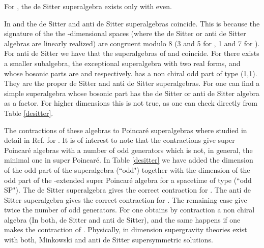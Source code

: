 \documentclass[a4paper,12pt]{article}
\begin{document}
For \coordHE{}, the de Sitter superalgebra exists only with \coordHE{}
even.

In \coordHE{} and \coordHE{} the de Sitter and anti de Sitter superalgebras
coincide. This is because the signature  \myHighlight{$\pm \rho$}\coordHE{}  of the  the
\coordHE{}-dimensional spaces (where the de Sitter or anti de Sitter
algebras are linearly realized) are congruent modulo 8 (3 and 5
for \coordHE{}, 1 and 7 for \coordHE{}). For anti de Sitter we have that
the superalgebras of \coordHE{} and \coordHE{} coincide. For \coordHE{}
there exists a smaller subalgebra, the exceptional superalgebra
\coordHE{} with two real forms, \coordHE{} and \coordHE{} whose bosonic
parts are \coordHE{} and \coordHE{} respectively. \coordHE{} has a non chiral odd part of type
(1,1). They are the proper de Sitter and anti de Sitter
superalgebras. For \coordHE{} one can find a simple superalgebra
whose bosonic part has the de Sitter or anti de Sitter algebra as
a factor. For higher dimensions this is not true, as one can check
directly from Table \ref{desitter}.

The contractions of these algebras to Poincar\'e superalgebras
where studied in detail in Ref.\cite{dflv} for \coordHE{}.  It is of
interest  to note that the contractions give super Poincar\'e
algebras with  a number of odd generators which is not, in
general,  the minimal one in super Poincar\'e. In Table
\ref{desitter} we have added the dimension of the odd part of the
superalgebra (``odd") together with the dimension of the odd part
of the \coordHE{}-extended super Poincar\'e algebra for a spacetime of
type \coordHE{} (``odd SP"). The de Sitter superalgebra gives the
correct contraction for \coordHE{}. The anti de Sitter
superalgebra gives the correct contraction for \coordHE{}.
The remaining case give twice the number of odd generators. For
\coordHE{} one obtains by contraction a non chiral algebra (In both,
de Sitter and anti de Sitter), and the same happens if one makes
the contraction of \coordHE{}. Physically, in dimension \coordHE{}
supergravity theories exist with both, Minkowski and anti de
Sitter supersymmetric solutions.
\end{document}
